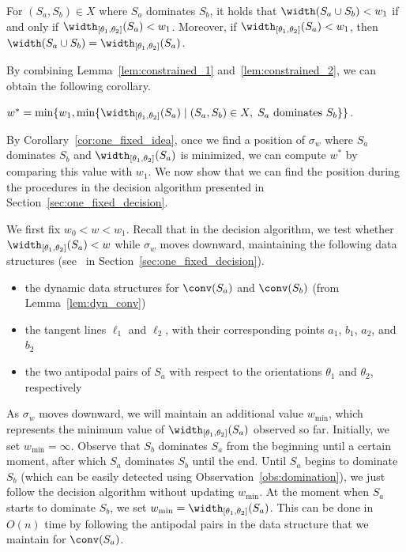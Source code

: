 \begin{lemma}
    \label{lem:constrained_2}
    For $(S_a,  S_b) \in X$ where $S_a$ dominates $S_b$, it holds that $\width(S_a \cup S_b) < w_1$
    if and only if $\width_{[\theta_1, \theta_2]}(S_a) < w_1$. 
    Moreover, if $\width_{[\theta_1, \theta_2]}(S_a) < w_1$, 
    then $\width(S_a \cup S_b)  =\width_{[\theta_1, \theta_2]}(S_a)$.
\end{lemma}

By combining Lemma~\ref{lem:constrained_1} and~\ref{lem:constrained_2}, we can obtain the following corollary.  

\begin{corollary}
    \label{cor:one_fixed_idea}
    $w^* = \min\{ w_1,  \min \{\width_{[\theta_1, \theta_2]}(S_a) \mid (S_a, S_b) \in X, \; S_a \textrm{ dominates } S_b\} \}$. 
\end{corollary}

By Corollary~\ref{cor:one_fixed_idea}, 
once we find a position of $\sigma_w$ where $S_a$ dominates $S_b$ and $\width_{[\theta_1, \theta_2]}(S_a)$ is minimized,
we can compute $w^*$ by comparing this value with $w_1$.
We now show that we can find the position during the procedures in the decision algorithm presented in Section~\ref{sec:one_fixed_decision}. 


We first fix $w_0 < w < w_1$. 
Recall that in the decision algorithm, we test whether $\width_{[\theta_1, \theta_2]}(S_a) < w$ while $\sigma_w$ moves downward, maintaining the following data structures
(see~\emph{} in Section~\ref{sec:one_fixed_decision}).

\begin{itemize}
    \item the dynamic data structures for $\conv(S_a)$ and $\conv(S_b)$ (from Lemma~\ref{lem:dyn_conv})
    \item the tangent lines $\ell_1$ and $\ell_2$, with their corresponding points $a_1$, $b_1$, $a_2$, and $b_2$
    \item the two antipodal pairs of $S_a$ with respect to the orientations $\theta_1$ and $\theta_2$, respectively
\end{itemize}

As $\sigma_w$ moves downward, we will maintain an additional value $w_{\min}$, which represents the minimum value of $\width_{[\theta_1, \theta_2]}(S_a)$ observed so far. 
Initially, we set $w_{\min} = \infty$.
Observe that $S_b$ dominates $S_a$ from the beginning until a certain moment, after which $S_a$ dominates $S_b$ until the end. 
Until $S_a$ begins to dominate $S_b$ (which can be easily detected using Observation~\ref{obs:domination}), we just follow the decision algorithm without updating $w_{\min}$. 
At the moment when $S_a$ starts to dominate $S_b$, we set  $w_{\min} = \width_{[\theta_1, \theta_2]}(S_a)$. 
This can be done in $O(n)$ time by following the antipodal pairs in the data structure that we maintain for $\conv(S_a)$.

